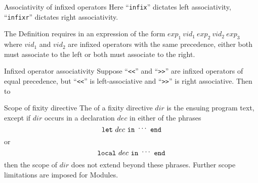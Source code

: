 \begin{comment}{Precedence must be between 0 and 9}
Observe this part of the Definition explicit constrains the precedence
for infixed operators must be between 0 and 9. In principle, there's no
reason it cannot be something larger (say, representable as an unsigned
byte or word --- i.e., between 0 and 256, or between 0 and
$2^{64}\approx 18.4\times 10^{18}$).

For what it's worth, in \S4.4.2 of the Haskell 2010 report\footnote{\url{http://www.haskell.org/onlinereport/haskell2010/haskellch4.html\#x10-820004.4.2}}, it appears
that Haskell has the precedence [which it calls the ``fixity''] ``must be in the range 0 to 9''.
So Haskell is following Standard ML here, neat.
\end{comment}

\begin{clause}{Associativity of infixed operators}
Here ``\texttt{infix}'' dictates left associativity, ``\texttt{infixr}''
dictates right associativity.

The Definition requires in an expression of the form
$exp_{1}~vid_{1}~exp_{2}~vid_{2}~exp_{3}$ where $vid_{1}$ and $vid_{2}$
are infixed operators with the same precedence, either both must
associate to the left or both must associate to the right.
\end{clause}

\begin{example}{Infixed operator associativity}
Suppose ``\verb#<<#'' and ``\verb#>>#'' are infixed operators of equal
precedence, but ``\verb#<<#'' is left-associative and ``\verb#>>#'' is
right associative. Then
\halign to
\end{example}

\begin{definition}{Scope of fixity directive}\label{syntax-core:infixed-operator:scope}
The  of a fixity directive $dir$ is the ensuing program
text, except if $dir$ occurs in a declaration $dec$ in either of the
phrases
\begin{equation*}
\mathtt{let}\ dec\ \mathtt{in}\ \syndots\ \mathtt{end}
\end{equation*}
or
\begin{equation*}
\mathtt{local}\ dec\ \mathtt{in}\ \syndots\ \mathtt{end}
\end{equation*}
then the scope of $dir$ does not extend beyond these phrases. Further
scope limitations are imposed for Modules.
\end{definition}


